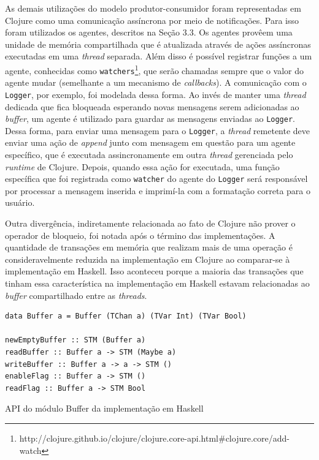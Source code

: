 As demais utilizações do modelo produtor-consumidor foram representadas em Clojure como uma comunicação assíncrona por meio de notificações. Para isso foram utilizados os agentes, descritos na Seção 3.3. Os agentes provêem uma unidade de memória compartilhada que é atualizada através de ações assíncronas executadas em uma \emph{thread} separada. Além disso é possível registrar funções a um agente, conhecidas como \verb|watchers|\footnote{http://clojure.github.io/clojure/clojure.core-api.html\#clojure.core/add-watch}, que serão chamadas sempre que o valor do agente mudar (semelhante a um mecanismo de \emph{callbacks}). A comunicação com o \verb|Logger|, por exemplo, foi modelada dessa forma. Ao invés de manter uma \emph{thread} dedicada que fica bloqueada esperando novas mensagens serem adicionadas ao \emph{buffer}, um agente é utilizado para guardar as mensagens enviadas ao \verb|Logger|. Dessa forma, para enviar uma mensagem para o \verb|Logger|, a \emph{thread} remetente deve enviar uma ação de \emph{append} junto com mensagem em questão para um agente específico, que é executada assincronamente em outra \emph{thread} gerenciada pelo \emph{runtime} de Clojure. Depois, quando essa ação for executada, uma função específica que foi registrada como \verb|watcher| do agente do \verb|Logger| será responsável por processar a mensagem inserida e imprimí-la com a formatação correta para o usuário.

Outra divergência, indiretamente relacionada ao fato de Clojure não prover o operador de bloqueio, foi notada após o término das implementações. A quantidade de transações em memória que realizam mais de uma operação é consideravelmente reduzida na implementação em Clojure ao comparar-se à implementação em Haskell. Isso aconteceu porque a maioria das transações que tinham essa característica na implementação em Haskell estavam relacionadas ao \emph{buffer} compartilhado entre as \emph{threads}. 

\begin{listing}[h]
  \begin{verbatim}
data Buffer a = Buffer (TChan a) (TVar Int) (TVar Bool)

newEmptyBuffer :: STM (Buffer a)
readBuffer :: Buffer a -> STM (Maybe a)
writeBuffer :: Buffer a -> a -> STM ()
enableFlag :: Buffer a -> STM ()
readFlag :: Buffer a -> STM Bool
  \end{verbatim}
  \caption{API do módulo Buffer da implementação em Haskell}
  \label{code:buffer-api}
\end{listing}

